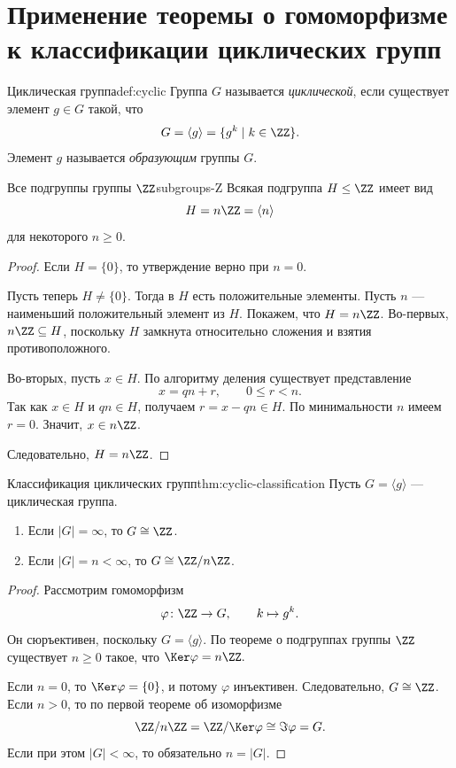 
\section{Применение теоремы о гомоморфизме к классификации циклических групп}

\begin{Definition}{Циклическая группа}{def:cyclic}
	Группа $G$ называется \emph{циклической}, если существует элемент $g\in G$ такой, что
	\[
	G=\langle g\rangle = \{g^k\mid k\in \ZZ\}.
	\]
	Элемент $g$ называется \emph{образующим} группы $G$.
\end{Definition}

\begin{Theorem}{Все подгруппы группы $\ZZ$}{subgroups-Z}
	Всякая подгруппа $H\le \ZZ$ имеет вид
	\[
	H=n\ZZ=\langle n\rangle
	\]
	для некоторого $n\ge 0$.
\end{Theorem}

\begin{proof}
	Если $H=\{0\}$, то утверждение верно при $n=0$.

	Пусть теперь $H\ne\{0\}$. Тогда в $H$ есть положительные элементы. Пусть $n$ --- наименьший положительный элемент из $H$. Покажем, что $H=n\ZZ$. Во-первых, $n\ZZ\subseteq H$, поскольку $H$ замкнута относительно сложения и взятия противоположного.

	Во-вторых, пусть $x\in H$. По алгоритму деления существует представление
	\[
	x=qn+r, \qquad 0\le r<n.
	\]
	Так как $x\in H$ и $qn\in H$, получаем $r=x-qn\in H.$
	По минимальности $n$ имеем $r=0$. Значит, $x\in n\ZZ$.

	Следовательно, $H=n\ZZ$.
\end{proof}

\begin{Theorem}{Классификация циклических групп}{thm:cyclic-classification}
	Пусть $G=\langle g\rangle$ --- циклическая группа.
	\begin{enumerate}
		\item Если $|G|=\infty$, то $G\cong \ZZ$.
		\item Если $|G|=n<\infty$, то $G\cong \ZZ/n\ZZ$.
	\end{enumerate}
\end{Theorem}

\begin{proof}
	Рассмотрим гомоморфизм
	\[
	\varphi\colon \ZZ \to G, \qquad k\mapsto g^k.
	\]
	Он сюръективен, поскольку $G=\langle g\rangle$. По теореме о подгруппах группы $\ZZ$ существует $n\ge 0$ такое, что $\Ker\varphi=n\ZZ.$

	Если $n=0$, то $\Ker\varphi=\{0\}$, и потому $\varphi$ инъективен. Следовательно, $G\cong \ZZ$. Если $n>0$, то по первой теореме об изоморфизме
	\[
	\ZZ/n\ZZ = \ZZ/\Ker\varphi \cong \Im\varphi = G.
	\]
	Если при этом $|G|<\infty$, то обязательно $n=|G|$.
\end{proof}
